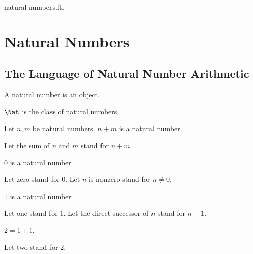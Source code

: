 \documentclass{naproche-library}
\begin{document}
\begin{smodule}{natural-numbers.ftl}


  \section*{Natural Numbers}

  \subsection*{The Language of Natural Number Arithmetic}

  \begin{signature}[forthel,id=ARITHMETIC_01_3074681254969344,printid]
    A natural number is an object.
  \end{signature}

  \begin{definition}[forthel,id=ARITHMETIC_01_7367148418629632,printid]
    $\Nat$ is the class of natural numbers.
  \end{definition}

  \begin{signature}[forthel,id=ARITHMETIC_01_1567933815848960,printid]
    Let $n, m$ be natural numbers.
    $n + m$ is a natural number.

    Let the sum of $n$ and $m$ stand for $n + m$.
  \end{signature}

  \begin{signature}[forthel,id=ARITHMETIC_01_7633304715001856,printid]
    $0$ is a natural number.

    Let zero stand for $0$.
    Let $n$ is nonzero stand for $n \neq 0$.
  \end{signature}

  \begin{signature}[forthel,id=ARITHMETIC_01_1200254566985232,printid]
    $1$ is a natural number.

    Let one stand for $1$.
    Let the direct successor of $n$ stand for $n + 1$.
  \end{signature}

  \begin{definition}[forthel,id=ARITHMETIC_01_4584236572999680,printid]
    $2 = 1 + 1$.

    Let two stand for $2$.
  \end{definition}


\end{smodule}
\end{document}
